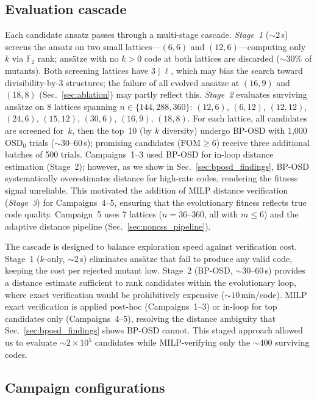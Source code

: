 \documentclass[aps,prxquantum,twocolumn,superscriptaddress,nofootinbib]{revtex4-2}
\newcommand{\FF}{\ensuremath{\mathbb{F}}}
\newcommand{\FOM}{\ensuremath{\mathrm{FOM}}}
\begin{document}
\subsection{Evaluation cascade}
\label{sec:cascade}

Each candidate ansatz passes through a multi-stage cascade.
\emph{Stage~1} (${\sim}2$\,s) screens the ansatz on two small lattices---$(6,6)$ and $(12,6)$---computing only~$k$ via $\FF_2$ rank; ansätze with no $k > 0$ code at both lattices are discarded (${\sim}30\%$ of mutants).
Both screening lattices have $3 \mid \ell$, which may bias the search toward divisibility-by-3 structures; the failure of all evolved ansätze at $(16,9)$ and $(18,8)$ (Sec.~\ref{sec:ablation}) may partly reflect this. 
\emph{Stage~2} evaluates surviving ansätze on 8 lattices spanning $n \in \{144, 288, 360\}$: $(12,6)$, $(6,12)$, $(12,12)$, $(24,6)$, $(15,12)$, $(30,6)$, $(16,9)$, $(18,8)$. 
For each lattice, all candidates are screened for~$k$, then the top~10 (by $k$ diversity) undergo BP-OSD with 1{,}000 OSD$_0$ trials (${\sim}30$--$60$\,s); promising candidates ($\FOM \geq 6$) receive three additional batches of 500 trials.
Campaigns~1--3 used BP-OSD for in-loop distance estimation (Stage~2); however, as we show in Sec.~\ref{sec:bposd_findings}, BP-OSD systematically overestimates distance for high-rate codes, rendering the fitness signal unreliable. This motivated the addition of MILP distance verification (\emph{Stage~3}) for Campaigns~4--5, ensuring that the evolutionary fitness reflects true code quality.
Campaign~5 uses 7 lattices ($n = 36$--$360$, all with $m \leq 6$) and the adaptive distance pipeline (Sec.~\ref{sec:noncss_pipeline}).

The cascade is designed to balance exploration speed against verification cost.
Stage~1 ($k$-only, ${\sim}2$\,s) eliminates ansätze that fail to produce any valid code, keeping the cost per rejected mutant low.
Stage~2 (BP-OSD, ${\sim}30$--$60$\,s) provides a distance estimate sufficient to rank candidates within the evolutionary loop, where exact verification would be prohibitively expensive (${\sim}10$\,min/code).
MILP exact verification is applied post-hoc (Campaigns~1--3) or in-loop for top candidates only (Campaigns~4--5), resolving the distance ambiguity that Sec.~\ref{sec:bposd_findings} shows BP-OSD cannot.
This staged approach allowed us to evaluate ${\sim}2 \times 10^5$ candidates while MILP-verifying only the ${\sim}400$ surviving codes.

\subsection{Campaign configurations}
\label{sec:campaigns}
\end{document}
